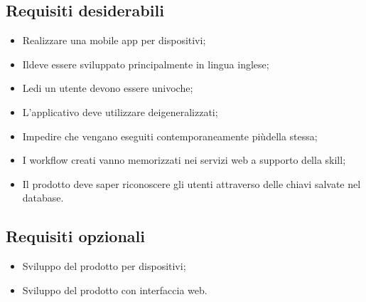 \subsection{Requisiti desiderabili}
\begin{itemize}
	\item Realizzare una mobile app per dispositivi;
	\item Ildeve essere sviluppato principalmente in lingua inglese;
	\item Ledi un utente devono essere univoche;
	\item L'applicativo deve utilizzare deigeneralizzati;
	\item Impedire che vengano eseguiti contemporaneamente piùdella stessa;
	\item I workflow creati vanno memorizzati nei servizi web a supporto della skill;
	\item Il prodotto deve saper riconoscere gli utenti attraverso delle chiavi salvate nel database.
\end{itemize}
\subsection{Requisiti opzionali}
\begin{itemize}
	\item Sviluppo del prodotto per dispositivi;
	\item Sviluppo del prodotto con interfaccia web.
\end{itemize}